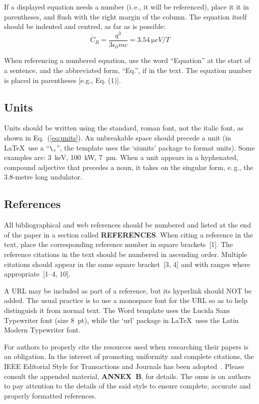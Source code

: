 \documentclass[a4paper,
              ]{jacow}
\newcommand\SEC[1]{\textbf{\uppercase{#1}}}
\begin{document}
If a displayed equation needs a number (i.\,e., it will be
referenced), place it it in parentheses, and flush with the
right margin of the column. The equation itself should be
indented and centred, as far as is possible:
\begin{equation}\label{eq:units}
    C_B=\frac{q^3}{3\epsilon_{0} mc}=\SI{3.54}{\micro eV/T}
\end{equation}

When referencing a numbered equation, use the word
“Equation” at the start of a sentence, and the abbreviated
form, “Eq.”, if in the text. The equation number is placed
in parentheses [e.g., Eq. (1)].

\subsection{Units}
	
Units should be written using the standard, roman font,
not the italic font, as shown in Eq.~(\ref{eq:units}).
An unbreakable space should precede a unit (in \LaTeX\ use a “\verb|\,|”,
the template uses the ‘siunits’ package to format units).
Some examples are: \SI{3}{keV},
\SI{100}{kW}, \SI{7}{µm}. When a unit appears in a hyphenated,
compound adjective that precedes a noun, it takes on the
singular form, e.\,g., the 3.8-metre long undulator.

\subsection{References}
%
%
All bibliographical and web references should be numbered and listed at the
end of the paper in a section called \SEC{References}. When citing a
reference in the text, place the corresponding reference number in square
brackets~[1]. The reference citations in the text should be numbered
in ascending order. Multiple citations should appear in
the same square bracket~[3, 4] and
with ranges where appropriate~[1--4, 10].

A URL may be included as part of a reference, but its
hyperlink should NOT be added. The usual practice is to
use a monospace font for the URL so as to help distinguish
it from normal text. The Word template uses the
Lucida Sans Typewriter font (size \SI{8}{pt}), while the ‘url’ 
package in \LaTeX\ uses the Latin Modern Typewriter font.

For authors to properly cite the resources used when researching
their papers is an obligation. In the interest of
promoting uniformity and complete citations, the IEEE
Editorial Style for Transactions and Journals has been
adopted~\cite{IEEE}. Please consult the appended material, \SEC{Annex~B},
for details. The onus is on authors to pay attention to
the details of the said style to ensure complete, accurate
and properly formatted references.
\end{document}
